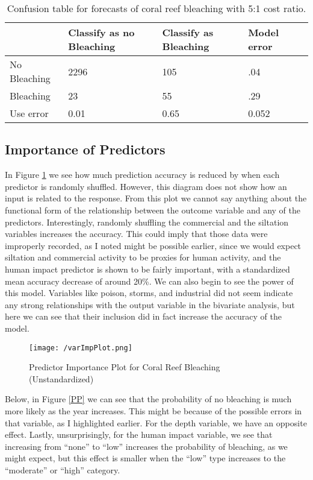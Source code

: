 \documentclass{article}
\begin{document}
\begin{table}[!htb]
\centering
\label{predict}
\begin{tabular}{|l|ll|ll|}
\hline
          & Classify as no Bleaching & Classify as Bleaching & Model error &  \\
          \hline
No Bleaching     & 2296              & 105             &  .04      &  \\
 Bleaching       & 23                & 55              & .29       &  \\
\hline
Use error        & 0.01              & 0.65            & 0.052     &  \\
\hline
\end{tabular}
\caption{Confusion table for forecasts of coral reef bleaching with 5:1 cost ratio.}
\end{table}

\subsection{Importance of Predictors}

In Figure \ref{vip} we see how much prediction accuracy is reduced by when each predictor is randomly shuffled. However, this diagram does not show how an input is related to the response. From this plot we cannot say anything about the functional form of the relationship between the outcome variable and any of the predictors. Interestingly, randomly shuffling the commercial and the siltation variables increases the accuracy. This could imply that those data were improperly recorded, as I noted might be possible earlier, since we would expect siltation and commercial activity to be proxies for human activity, and the human impact predictor is shown to be fairly important, with a standardized mean accuracy decrease of around 20\%. We can also begin to see the power of this model. Variables like poison, storms, and industrial did not seem indicate any strong relationships with the output variable in the bivariate analysis, but here we can see that their inclusion did in fact increase the accuracy of the model. 

\begin{figure}[!htb]
    \centering
    \texttt{[image: /varImpPlot.png]}
    \caption{Predictor Importance Plot for Coral Reef Bleaching (Unstandardized)}
    \label{vip}
\end{figure}
\newpage
Below, in Figure \ref{PP} we can see that the probability of no bleaching is much more likely as the year increases. This might be because of the possible errors in that variable, as I highlighted earlier. For the depth variable, we have an opposite effect. Lastly, unsurprisingly, for the human impact variable, we see that increasing from ``none'' to ``low'' increases the probability of bleaching, as we might expect, but this effect is smaller when the ``low'' type increases to the ``moderate'' or ``high'' category. 
\end{document}
